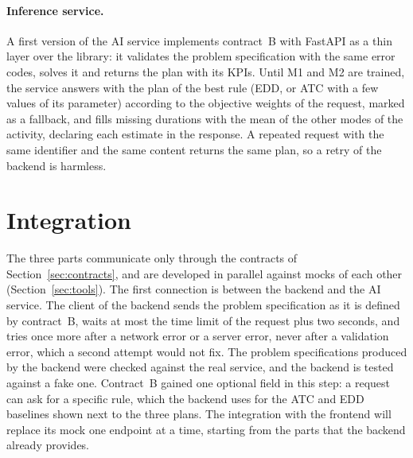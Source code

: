 \paragraph{Inference service.} A first version of the AI service implements contract~B with
FastAPI as a thin layer over the library: it validates the problem specification with the same
error codes, solves it and returns the plan with its KPIs. Until M1 and M2 are trained, the
service answers with the plan of the best rule (EDD, or ATC with a few values of its parameter)
according to the objective weights of the request, marked as a fallback, and fills missing
durations with the mean of the other modes of the activity, declaring each estimate in the
response. A repeated request with the same identifier and the same content returns the same
plan, so a retry of the backend is harmless.

\section{Integration}
\label{sec:impl-integration}

The three parts communicate only through the contracts of Section~\ref{sec:contracts}, and are
developed in parallel against mocks of each other (Section~\ref{sec:tools}). The first
connection is between the backend and the AI service. The client of the backend sends the
problem specification as it is defined by contract~B, waits at most the time limit of the request
plus two seconds, and tries once more after a network error or a server error, never after a
validation error, which a second attempt would not fix. The problem specifications produced by
the backend were checked against the real service, and the backend is tested against a fake one.
Contract~B gained one optional field in this step: a request can ask for a specific rule, which
the backend uses for the ATC and EDD baselines shown next to the three plans. The integration
with the frontend will replace its mock one endpoint at a time, starting from the parts that the
backend already provides.
